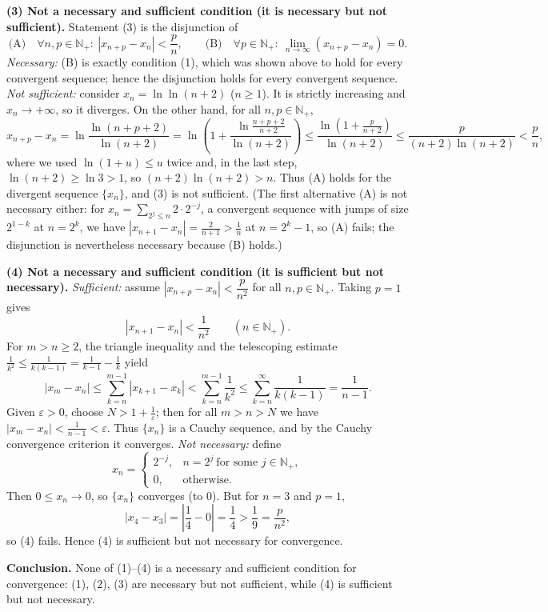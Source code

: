 \documentclass[11pt,a4paper]{article}
\newenvironment{solution}[1]{%
  \par\addvspace{1.7ex}%
  \noindent{\color{solutioncolor}\textbf{#1}}\hspace{0.55em}\ignorespaces}%
  {\par\addvspace{0.9ex}}
\begin{document}
\begin{solution}{Solution 2.3.12}
\textbf{(3) Not a necessary and sufficient condition (it is necessary but not sufficient).}
Statement (3) is the disjunction of
\[
\text{(A)}\quad \forall n,p\in\mathbb N_+:\ |x_{n+p}-x_n|<\frac{p}{n},
\qquad
\text{(B)}\quad \forall p\in\mathbb N_+:\ \lim_{n\to\infty}(x_{n+p}-x_n)=0 .
\]
\emph{Necessary:} (B) is exactly condition (1), which was shown above to hold for every convergent sequence; hence the disjunction holds for every convergent sequence.
\emph{Not sufficient:} consider $x_n=\ln\ln(n+2)$ ($n\ge1$). It is strictly increasing and $x_n\to+\infty$, so it diverges. On the other hand, for all $n,p\in\mathbb N_+$,
\[
x_{n+p}-x_n=\ln\frac{\ln(n+p+2)}{\ln(n+2)}
=\ln\!\left(1+\frac{\ln\frac{n+p+2}{n+2}}{\ln(n+2)}\right)
\le\frac{\ln\left(1+\frac{p}{n+2}\right)}{\ln(n+2)}
\le\frac{p}{(n+2)\ln(n+2)}<\frac{p}{n},
\]
where we used $\ln(1+u)\le u$ twice and, in the last step, $\ln(n+2)\ge\ln3>1$, so $(n+2)\ln(n+2)>n$. Thus (A) holds for the divergent sequence $\{x_n\}$, and (3) is not sufficient. (The first alternative (A) is not necessary either: for $x_n=\sum_{2^j\le n}2\cdot2^{-j}$, a convergent sequence with jumps of size $2^{1-k}$ at $n=2^k$, we have $|x_{n+1}-x_n|=\frac{2}{n+1}>\frac1n$ at $n=2^k-1$, so (A) fails; the disjunction is nevertheless necessary because (B) holds.)

\textbf{(4) Not a necessary and sufficient condition (it is sufficient but not necessary).}
\emph{Sufficient:} assume $|x_{n+p}-x_n|<\dfrac{p}{n^2}$ for all $n,p\in\mathbb N_+$. Taking $p=1$ gives
\[
|x_{n+1}-x_n|<\frac{1}{n^2}\qquad(n\in\mathbb N_+).
\]
For $m>n\ge2$, the triangle inequality and the telescoping estimate $\frac{1}{k^2}\le\frac{1}{k(k-1)}=\frac{1}{k-1}-\frac1k$ yield
\[
|x_m-x_n|\le\sum_{k=n}^{m-1}|x_{k+1}-x_k|<\sum_{k=n}^{m-1}\frac{1}{k^2}
\le\sum_{k=n}^{\infty}\frac{1}{k(k-1)}=\frac{1}{n-1}.
\]
Given $\varepsilon>0$, choose $N>1+\frac1\varepsilon$; then for all $m>n>N$ we have $|x_m-x_n|<\frac{1}{n-1}<\varepsilon$. Thus $\{x_n\}$ is a Cauchy sequence, and by the Cauchy convergence criterion it converges.
\emph{Not necessary:} define
\[
x_n=\begin{cases}2^{-j}, & n=2^j\ \text{for some } j\in\mathbb N_+,\\[2pt] 0, & \text{otherwise.}\end{cases}
\]
Then $0\le x_n\to0$, so $\{x_n\}$ converges (to $0$). But for $n=3$ and $p=1$,
\[
|x_{4}-x_3|=\left|\frac14-0\right|=\frac14>\frac{1}{9}=\frac{p}{n^2},
\]
so (4) fails. Hence (4) is sufficient but not necessary for convergence.

\textbf{Conclusion.} None of (1)--(4) is a necessary and sufficient condition for convergence: (1), (2), (3) are necessary but not sufficient, while (4) is sufficient but not necessary.
\end{solution}
\end{document}
